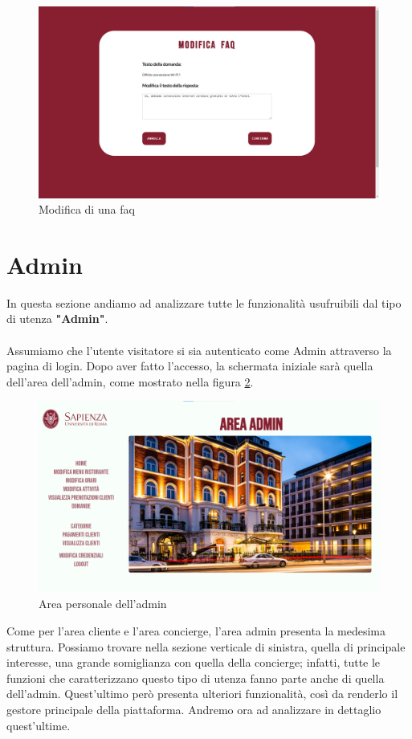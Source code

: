 \documentclass [a4paper, 12pt]{book}
\begin{document}
\begin{figure}[h]
\centering
\includegraphics[scale=0.3]{ModificaFaq.png}
\caption{Modifica di una faq}
\label{ModificaFaq}
\end{figure}

\section{Admin}
In questa sezione andiamo ad analizzare tutte le funzionalità usufruibili dal tipo di utenza \textbf{"Admin"}.\\\\
Assumiamo che l'utente visitatore si sia autenticato come Admin attraverso la pagina di login. Dopo aver fatto l'accesso, la schermata iniziale sarà quella dell'area dell'admin, come mostrato nella figura \ref{AreaAdmin}. 

\begin{figure}[h]
\centering
\includegraphics[scale=0.24]{AreaAdmin.png}
\caption{Area personale dell'admin}
\label{AreaAdmin}
\end{figure}\newpage
Come per l'area cliente e l'area concierge, l'area admin presenta la medesima struttura. Possiamo trovare nella sezione verticale di sinistra, quella di principale interesse, una grande somiglianza con quella della concierge; infatti, tutte le funzioni che caratterizzano questo tipo di utenza fanno parte anche di quella dell'admin. Quest'ultimo però presenta ulteriori funzionalità, così da renderlo il gestore principale della piattaforma. Andremo ora ad analizzare in dettaglio quest'ultime.
\end{document}

